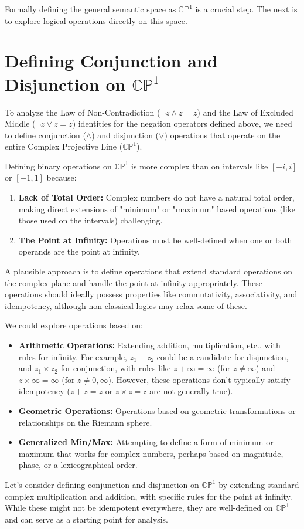 	Formally defining the general semantic space as $\mathbb{CP}^1$ is a crucial step. The next is to explore logical operations directly on this space.
	
	\section{Defining Conjunction and Disjunction on $\mathbb{CP}^1$}
	
	To analyze the Law of Non-Contradiction ($\neg z \wedge z = z$) and the Law of Excluded Middle ($\neg z \vee z = z$) identities for the negation operators defined above, we need to define conjunction ($\wedge$) and disjunction ($\vee$) operations that operate on the entire Complex Projective Line ($\mathbb{CP}^1$).
	
	Defining binary operations on $\mathbb{CP}^1$ is more complex than on intervals like $[-i, i]$ or $[-1, 1]$ because:
	
	\begin{enumerate}
		\item \textbf{Lack of Total Order:} Complex numbers do not have a natural total order, making direct extensions of "minimum" or "maximum" based operations (like those used on the intervals) challenging.
		
		\item \textbf{The Point at Infinity:} Operations must be well-defined when one or both operands are the point at infinity.
	\end{enumerate}
	A plausible approach is to define operations that extend standard operations on the complex plane and handle the point at infinity appropriately. These operations should ideally possess properties like commutativity, associativity, and idempotency, although non-classical logics may relax some of these.
	
	We could explore operations based on:
	
	\begin{itemize}
		\item \textbf{Arithmetic Operations:} Extending addition, multiplication, etc., with rules for infinity. For example, $z_1 + z_2$ could be a candidate for disjunction, and $z_1 \times z_2$ for conjunction, with rules like $z + \infty = \infty$ (for $z \neq \infty$) and $z \times \infty = \infty$ (for $z \neq 0, \infty$). However, these operations don't typically satisfy idempotency ($z+z=z$ or $z \times z=z$ are not generally true).
		
		\item \textbf{Geometric Operations:} Operations based on geometric transformations or relationships on the Riemann sphere.
		
		\item \textbf{Generalized Min/Max:} Attempting to define a form of minimum or maximum that works for complex numbers, perhaps based on magnitude, phase, or a lexicographical order.
	\end{itemize}
	Let's consider defining conjunction and disjunction on $\mathbb{CP}^1$ by extending standard complex multiplication and addition, with specific rules for the point at infinity. While these might not be idempotent everywhere, they are well-defined on $\mathbb{CP}^1$ and can serve as a starting point for analysis.
	
